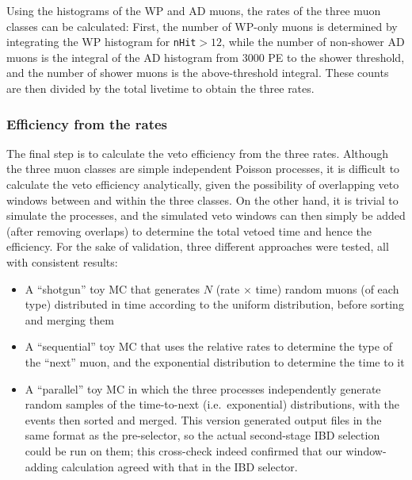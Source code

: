 \documentclass[../thesis.tex]{subfiles}
\begin{document}
\begin{comment}
  XXX local slides from mid-late Oct for retrigger plots. See misc_ana/MuonVetoEff/condenser4retrig.

Are our efficiencies biased because we don't count for the'' `muon multiplicity efficiency' coming from being falsely ignored as a retrigger?
\end{comment}

Using the histograms of the WP and AD muons, the rates of the three muon classes can be calculated: First, the number of WP-only muons is determined by integrating the WP histogram for \texttt{nHit}$> 12$, while the number of non-shower AD muons is the integral of the AD histogram from 3000 PE to the shower threshold, and the number of shower muons is the above-threshold integral. These counts are then divided by the total livetime to obtain the three rates.

\subsubsection{Efficiency from the rates}
\label{sec:cutVaryMuVetoEffFromRates}

The final step is to calculate the veto efficiency from the three rates. Although the three muon classes are simple independent Poisson processes, it is difficult to calculate the veto efficiency analytically, given the possibility of overlapping veto windows between and within the three classes. On the other hand, it is trivial to simulate the processes, and the simulated veto windows can then simply be added (after removing overlaps) to determine the total vetoed time and hence the efficiency. For the sake of validation, three different approaches were tested, all with consistent results:

\begin{itemize}
\item A ``shotgun'' toy MC that generates $N$ (rate $\times$ time) random muons (of each type) distributed in time according to the uniform distribution, before sorting and merging them
\item A ``sequential'' toy MC that uses the relative rates to determine the type of the ``next'' muon, and the exponential distribution to determine the time to it
\item A ``parallel'' toy MC in which the three processes independently generate random samples of the time-to-next (i.e.\ exponential) distributions, with the events then sorted and merged. This version generated output files in the same format as the pre-selector, so the actual second-stage IBD selection could be run on them; this cross-check indeed confirmed that our window-adding calculation agreed with that in the IBD selector.
\end{itemize}
\end{document}
